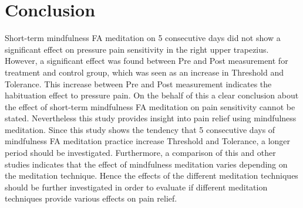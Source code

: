 \section{Conclusion}
Short-term mindfulness FA meditation on 5 consecutive days did not show a significant effect on pressure pain sensitivity in the right upper trapezius. However, a significant effect was found between Pre and Post measurement for treatment and control group, which was seen as an increase in Threshold and Tolerance. This increase between Pre and Post measurement indicates the habituation effect to pressure pain.
On the behalf of this a clear conclusion about the effect of short-term mindfulness FA meditation on pain sensitivity cannot be stated. Nevertheless this study provides insight into pain relief using mindfulness meditation.
Since this study shows the tendency that 5 consecutive days of mindfulness FA meditation practice increase Threshold and Tolerance, a longer period should be investigated. 
Furthermore, a comparison of this and
other studies indicates that the effect of mindfulness meditation varies depending on the
meditation technique. Hence the effects of the different meditation techniques should be
further investigated in order to evaluate if different meditation techniques provide various
effects on pain relief.


